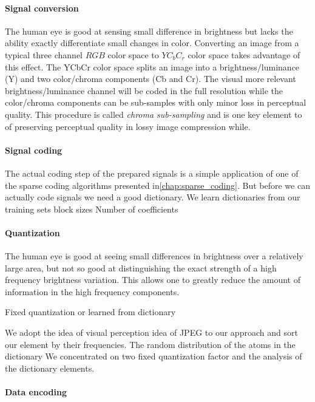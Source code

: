 \paragraph{Signal conversion}
The human eye is good at sensing small difference in brightness but lacks the
ability exactly differentiate small changes in color. Converting an image from a
typical three channel $RGB$ color space to $YC_bC_r$ color space takes advantage
of
this effect. The YCbCr color space splits an image
into a brightness/luminance (Y) and two color/chroma components (Cb
and Cr). The visual more relevant brightness/luminance channel will be coded
in the full resolution while the color/chroma components can be sub-samples
with only minor loss in perceptual quality. This procedure is called
\emph{chroma sub-sampling} and is one key element to of preserving perceptual
quality in lossy image compression while.

\paragraph{Signal coding}
The actual coding step of the prepared signals is a simple application of one
of the sparse coding algorithms presented in\ref{chap:sparse_coding}.
But before we can actually code signals we need a good dictionary.
We learn dictionaries from our training sets 
block sizes
Number of coefficients


\paragraph{Quantization}
The human eye is good at seeing small differences in brightness over a
relatively large area, but not so good at distinguishing the exact strength of a
high frequency brightness variation. This allows one to greatly reduce the
amount of information in the high frequency components. 

Fixed quantization or learned from dictionary

We adopt the idea of visual perception idea of JPEG to our
approach and sort our element by their frequencies.
The random distribution of the atoms in the dictionary 
We concentrated on two fixed quantization factor and the analysis of the
dictionary elements.



\paragraph{Data encoding}

